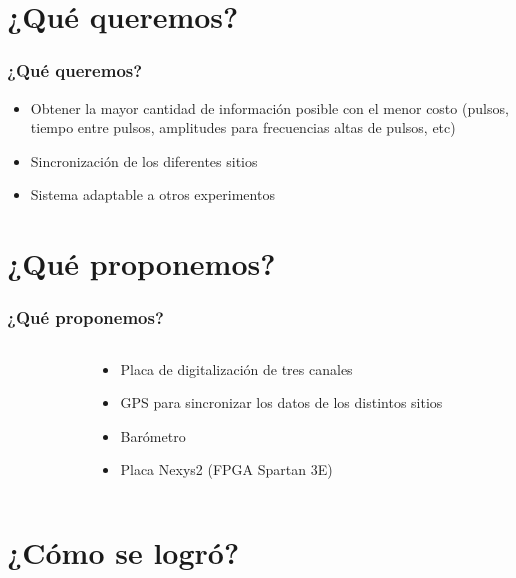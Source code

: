 \documentclass{beamer}
\begin{document}
\section{¿Qué queremos?}
\begin{frame}
	\frametitle{¿Qué queremos?}
		\begin{block}{}
    	\begin{itemize}
      	\item Obtener la mayor cantidad de información
							posible con el menor costo (pulsos, tiempo
							entre pulsos, amplitudes para frecuencias
							altas de pulsos, etc) 
      	\item Sincronización de los diferentes sitios
      	\item Sistema adaptable a otros experimentos
    	\end{itemize}
		\end{block}
\end{frame} 

\section[Propuesta]{¿Qué proponemos?}

\begin{frame}
	\frametitle{¿Qué proponemos?}

\begin{columns}
 	\begin{column}{0.55\textwidth}
 \end{column}
	\begin{column}{0.40\textwidth}
		\begin{block}{}
    	\begin{itemize}[<+->]
      	\item Placa de digitalización de tres canales
      	\item GPS para sincronizar los datos de los 
							distintos sitios
      	\item Barómetro 
				\item Placa Nexys2 (FPGA Spartan 3E)
    	\end{itemize}
		\end{block}
	\end{column} 
\end{columns}
\end{frame} 

\section{¿Cómo se logró?}
\end{document}
